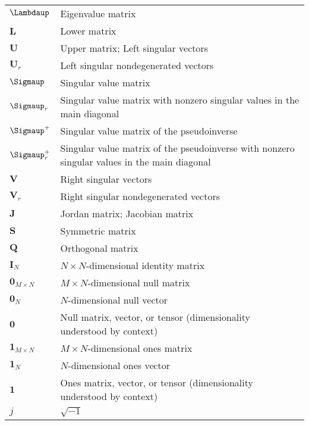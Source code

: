 \documentclass{article}
\begin{document}
\begin{xltabular}{\textwidth}{XX}
    \(\boldsymbol{\Lambdaup}\) & Eigenvalue matrix \\
    \(\mathbf{L}\) & Lower matrix\\
    \(\mathbf{U}\) & Upper matrix; Left singular vectors\\
    \(\mathbf{U}_r\) & Left singular nondegenerated vectors\\
    \(\boldsymbol{\Sigmaup}\) & Singular value matrix\\
    \(\boldsymbol{\Sigmaup}_r\) & Singular value matrix with nonzero singular values in the main diagonal\\
    \(\boldsymbol{\Sigmaup}^{+}\) & Singular value matrix of the pseudoinverse\\
    \(\boldsymbol{\Sigmaup}^{+}_r\) & Singular value matrix of the pseudoinverse with nonzero singular values in the main diagonal\\
    \(\mathbf{V}\) & Right singular vectors\\
    \(\mathbf{V}_r\) & Right singular nondegenerated vectors\\
    \(\mathbf{J}\) & Jordan matrix; Jacobian matrix\\
    \(\mathbf{S}\) & Symmetric matrix\\
    \(\mathbf{Q}\) & Orthogonal matrix\\
    \(\mathbf{I}_N\) & \(N\times N\)-dimensional identity matrix\\
    \(\mathbf{0}_{M\times N}\) & \(M\times N\)-dimensional null matrix\\
    \(\mathbf{0}_{N}\) & \(N\)-dimensional null vector\\
    \(\mathbf{0}\) & Null matrix, vector, or tensor (dimensionality understood by context)\\
    \(\mathbf{1}_{M\times N}\) & \(M\times N\)-dimensional ones matrix\\
    \(\mathbf{1}_{N}\) & \(N\)-dimensional ones vector\\
    \(\mathbf{1}\) & Ones matrix, vector, or tensor (dimensionality understood by context)\\
    \(j\)& \(\sqrt{-1}\)
\end{xltabular}
\end{document}
